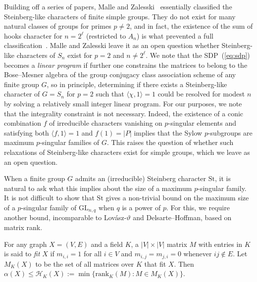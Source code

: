 \documentclass[12pt]{article}
\begin{document}
Building off a series of papers, Malle and Zalesski~\cite{MalleZ20} essentially classified the Steinberg-like characters of finite simple groups. They do not exist for many natural classes of groups for primes $p \neq 2$, and in fact, the existence of the sum of hooks character for $n = 2^\ell$ (restricted to $A_n$) is what prevented a full classification~\cite{MalleZ20}. Malle and Zalesski leave it as an open question whether Steinberg-like characters of $S_n$ exist for $p=2$ and $n \neq 2^\ell$. We note that the SDP~(\ref{eq:sdp}) becomes a \emph{linear program} if further one constrains the matrices to belong to the Bose--Mesner algebra of the group conjugacy class association scheme of any finite group $G$, so in principle, determining if there exists a Steinberg-like character of $G=S_n$ for $p=2$ such that $\langle \chi, 1\rangle = 1$ could be resolved for modest $n$ by solving a relatively small integer linear program. For our purposes, we note that the integrality constraint is not necessary. Indeed, the existence of a conic combination $f$ of irreducible characters vanishing on $p$-singular elements and satisfying both $\langle f , 1 \rangle = 1$ and $f(1) = |P|$ implies that the Sylow $p$-subgroups are maximum $p$-singular families of $G$. This raises the question of whether such relaxations of Steinberg-like characters exist for simple groups, which we leave as an open question.



When a finite group $G$ admits an (irreducible) Steinberg character $\mathrm{St}$, it is natural to ask what this implies about the size of a maximum $p$-singular family. It is not difficult to show that $\mathrm{St}$ gives a non-trivial bound on the maximum size of a $p$-singular family of $\mathrm{GL}_{n,q}$ when $q$ is a power of $p$. For this, we require another bound, incomparable to Lov\'asz-$\vartheta$ and Delsarte--Hoffman, based on matrix rank.
\begin{theorem}
For any graph $X = (V,E)$ and a field $K$, a $|V| \times |V|$ matrix $M$ with entries in $K$ is said to \emph{fit} $X$ if $m_{i,i} = 1$ for all $i \in V$ and $m_{i,j} = m_{j,i} = 0$ whenever $ij \not \in E$. Let $M_K(X)$ to be the set of all matrices over $K$ that fit $X$. Then $\alpha(X) \leq \mathcal{H}_K(X) := \min\{\mathrm{rank}_K(M) : M \in M_K(X)\}$. 
\end{theorem}
\end{document}
